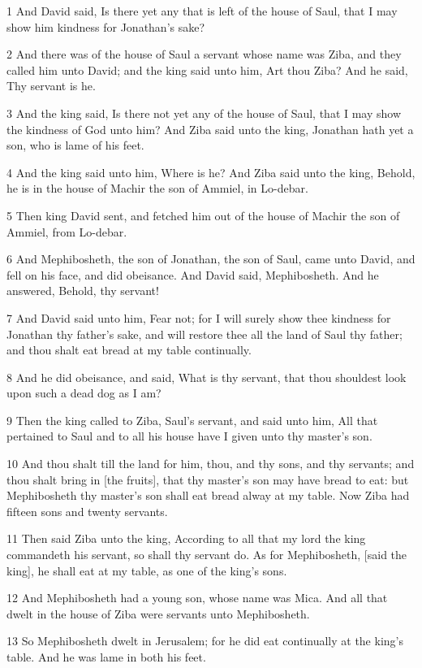 \par 1 And David said, Is there yet any that is left of the house of Saul, that I may show him kindness for Jonathan's sake?
\par 2 And there was of the house of Saul a servant whose name was Ziba, and they called him unto David; and the king said unto him, Art thou Ziba? And he said, Thy servant is he.
\par 3 And the king said, Is there not yet any of the house of Saul, that I may show the kindness of God unto him? And Ziba said unto the king, Jonathan hath yet a son, who is lame of his feet.
\par 4 And the king said unto him, Where is he? And Ziba said unto the king, Behold, he is in the house of Machir the son of Ammiel, in Lo-debar.
\par 5 Then king David sent, and fetched him out of the house of Machir the son of Ammiel, from Lo-debar.
\par 6 And Mephibosheth, the son of Jonathan, the son of Saul, came unto David, and fell on his face, and did obeisance. And David said, Mephibosheth. And he answered, Behold, thy servant!
\par 7 And David said unto him, Fear not; for I will surely show thee kindness for Jonathan thy father's sake, and will restore thee all the land of Saul thy father; and thou shalt eat bread at my table continually.
\par 8 And he did obeisance, and said, What is thy servant, that thou shouldest look upon such a dead dog as I am?
\par 9 Then the king called to Ziba, Saul's servant, and said unto him, All that pertained to Saul and to all his house have I given unto thy master's son.
\par 10 And thou shalt till the land for him, thou, and thy sons, and thy servants; and thou shalt bring in [the fruits], that thy master's son may have bread to eat: but Mephibosheth thy master's son shall eat bread alway at my table. Now Ziba had fifteen sons and twenty servants.
\par 11 Then said Ziba unto the king, According to all that my lord the king commandeth his servant, so shall thy servant do. As for Mephibosheth, [said the king], he shall eat at my table, as one of the king's sons.
\par 12 And Mephibosheth had a young son, whose name was Mica. And all that dwelt in the house of Ziba were servants unto Mephibosheth.
\par 13 So Mephibosheth dwelt in Jerusalem; for he did eat continually at the king's table. And he was lame in both his feet.

